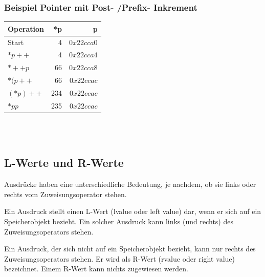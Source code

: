 			\hspace*{0.5cm}
			\begin{minipage}[t]{8 cm}
				\subsubsection{Beispiel Pointer mit Post- /Prefix- Inkrement}
					
					\begin{tabular}{|l|r|r|}
					  \hline
					  Operation &  *p & p \\
					  \hline
					  Start & 4 & $0x22cca0$ \\
					  $*p++$ & 4 & $0x22cca4$ \\
					  $*++p$ & 66 & $0x22cca8$ \\
					  $*(p++$ & 66 & $0x22ccac$ \\
					  $(*p)++$ & 234 & $0x22ccac$ \\
					  $*pp$ & 235 & $0x22ccac$ \\
					  \hline
					\end{tabular}
			\end{minipage}\\\\
				\begin{minipage}[t]{13 cm}
				\subsection{L-Werte und R-Werte }
					\begin{compactitem}
						\item Ausdrücke haben eine unterschiedliche Bedeutung, je nachdem, ob sie links oder rechts vom Zuweisungsoperator stehen.
						\item Ein Ausdruck stellt einen L-Wert (lvalue oder left value) dar, wenn er
						sich auf ein Speicherobjekt bezieht. Ein solcher Ausdruck kann links (und rechts) des Zuweisungsoperators stehen.
						\item Ein Ausdruck, der sich nicht auf ein Speicherobjekt bezieht, kann nur
						rechts des Zuweisungsoperators stehen. Er wird als R-Wert (rvalue oder right value) bezeichnet. Einem R-Wert kann nichts zugewiesen werden.\\
						
					\end{compactitem}
				\end{minipage}
				\hspace*{1cm}

